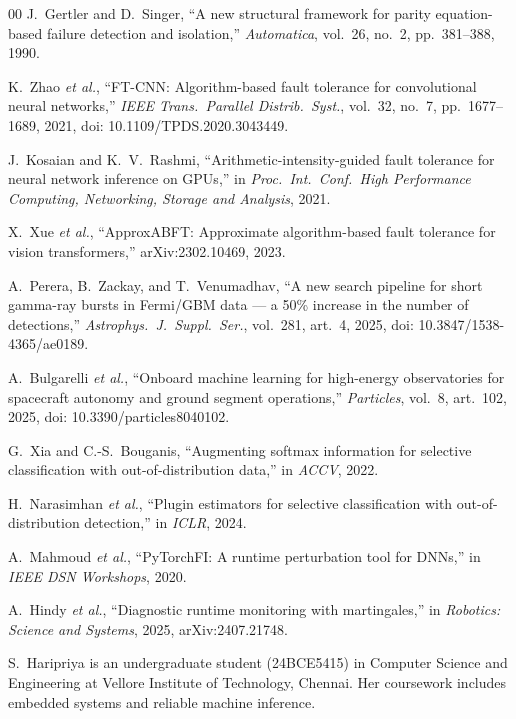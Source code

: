 \documentclass{ieeeaccess}
\begin{document}
\begin{thebibliography}{00}
J.~Gertler and D.~Singer, ``A new structural framework for parity equation-based failure detection and isolation,'' \textit{Automatica}, vol.~26, no.~2, pp.~381--388, 1990.

K.~Zhao \textit{et al.}, ``FT-CNN: Algorithm-based fault tolerance for convolutional neural networks,'' \textit{IEEE Trans.\ Parallel Distrib.\ Syst.}, vol.~32, no.~7, pp.~1677--1689, 2021, doi: 10.1109/TPDS.2020.3043449.

J.~Kosaian and K.~V.~Rashmi, ``Arithmetic-intensity-guided fault tolerance for neural network inference on GPUs,'' in \textit{Proc.\ Int.\ Conf.\ High Performance Computing, Networking, Storage and Analysis}, 2021.

X.~Xue \textit{et al.}, ``ApproxABFT: Approximate algorithm-based fault tolerance for vision transformers,'' arXiv:2302.10469, 2023.

A.~Perera, B.~Zackay, and T.~Venumadhav, ``A new search pipeline for short gamma-ray bursts in Fermi/GBM data --- a 50\% increase in the number of detections,'' \textit{Astrophys.\ J.\ Suppl.\ Ser.}, vol.~281, art.~4, 2025, doi: 10.3847/1538-4365/ae0189.

A.~Bulgarelli \textit{et al.}, ``Onboard machine learning for high-energy observatories for spacecraft autonomy and ground segment operations,'' \textit{Particles}, vol.~8, art.~102, 2025, doi: 10.3390/particles8040102.

G.~Xia and C.-S.~Bouganis, ``Augmenting softmax information for selective classification with out-of-distribution data,'' in \textit{ACCV}, 2022.

H.~Narasimhan \textit{et al.}, ``Plugin estimators for selective classification with out-of-distribution detection,'' in \textit{ICLR}, 2024.

A.~Mahmoud \textit{et al.}, ``PyTorchFI: A runtime perturbation tool for DNNs,'' in \textit{IEEE DSN Workshops}, 2020.

A.~Hindy \textit{et al.}, ``Diagnostic runtime monitoring with martingales,'' in \textit{Robotics: Science and Systems}, 2025, arXiv:2407.21748.

\end{thebibliography}

\begin{IEEEbiographynophoto}{S.~Haripriya}
is an undergraduate student (24BCE5415) in Computer Science and Engineering at Vellore Institute of Technology, Chennai. Her coursework includes embedded systems and reliable machine inference.
\end{IEEEbiographynophoto}

\EOD
\end{document}
